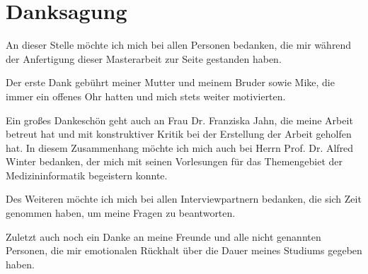 
\begingroup
\let\clearpage\relax
\let\cleardoublepage\relax
\let\cleardoublepage\relax
\chapter*{Danksagung}

An dieser Stelle möchte ich mich bei allen Personen bedanken, die mir während der Anfertigung dieser Masterarbeit zur Seite gestanden haben.

Der erste Dank gebührt meiner Mutter und meinem Bruder sowie Mike, die immer ein offenes Ohr hatten und mich stets weiter motivierten.

Ein großes Dankeschön geht auch an Frau Dr. Franziska Jahn, die meine Arbeit betreut hat und mit konstruktiver Kritik bei der Erstellung der Arbeit geholfen hat. In diesem Zusammenhang möchte ich mich auch bei Herrn Prof. Dr. Alfred Winter bedanken, der mich mit seinen Vorlesungen für das Themengebiet der Medizininformatik begeistern konnte.

Des Weiteren möchte ich mich bei allen Interviewpartnern bedanken, die sich Zeit genommen haben, um meine Fragen zu beantworten.

Zuletzt auch noch ein Danke an meine Freunde und alle nicht genannten Personen, die mir emotionalen Rückhalt über die Dauer meines Studiums gegeben haben.

\endgroup
